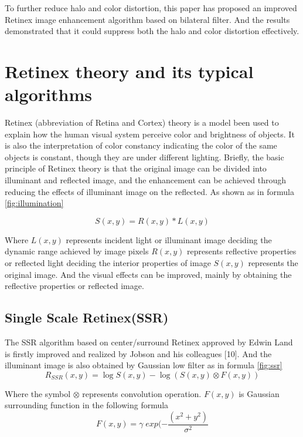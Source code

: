 To further reduce halo and color distortion, this paper has proposed an improved Retinex image
enhancement algorithm based on bilateral filter. And the results demonstrated that it could suppress
both the halo and color distortion effectively. 

\section{Retinex theory and its typical algorithms }
Retinex (abbreviation of Retina and Cortex) theory is a model been used to explain how the
human visual system perceive color and brightness of objects. It is also the interpretation of
color constancy indicating the color of the same objects is constant, though they are under different
lighting. Briefly, the basic principle of Retinex theory is that the original image can be divided into
illuminant and reflected image, and the enhancement can be achieved through reducing the effects
of illuminant image on the reflected. As shown as in formula \eqref{fig:illumination} 

\begin{equation}
	S(x,y)=R(x,y)*L(x,y)
	\label{fig:illumination}
\end{equation}

Where $L(x,y)$ represents incident light or illuminant image deciding the dynamic range
achieved by image pixels $R(x,y)$ represents reflective properties or reflected light deciding the
interior properties of image $S(x,y)$ represents the original image. And the visual effects can be
improved, mainly by obtaining the reflective properties or reflected image. 

\subsection{Single Scale Retinex(SSR)}
The SSR algorithm based on center/surround Retinex approved by Edwin Land is firstly
improved and realized by Jobson and his colleagues [10]. And the illuminant image is also obtained
by Gaussian low filter as in formula \eqref{fig:ssr}
\begin{equation}
	R_{SSR}(x,y)=\log S(x,y) - \log (S(x,y) \otimes F(x,y))
	\label{fig:ssr}
\end{equation}

Where the symbol $\otimes$ represents convolution operation. $F(x, y)$ is Gaussian surrounding
function in the following formula
\begin{equation}
	F(x,y)= \gamma \; exp(- \frac{(x^{2}+y^{2})}{\sigma^{2}}
	\label{fig:ssr1}
\end{equation}

